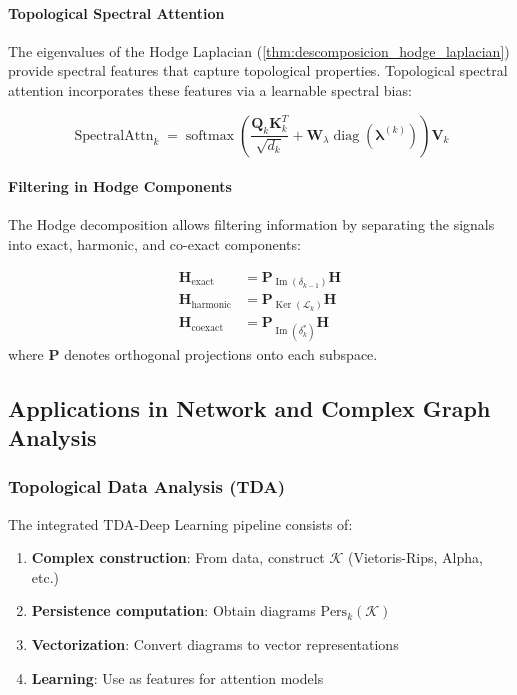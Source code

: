 \paragraph{Topological Spectral Attention}

The eigenvalues of the Hodge Laplacian (\autoref{thm:descomposicion_hodge_laplacian}) provide spectral features that capture topological properties. Topological spectral attention incorporates these features via a learnable spectral bias:

\begin{equation}
\operatorname{SpectralAttn}_k = \operatorname{softmax}\left(\frac{\mathbf{Q}_k \mathbf{K}_k^T}{\sqrt{d_k}} + \mathbf{W}_{\lambda} \operatorname{diag}(\boldsymbol{\lambda}^{(k)})\right) \mathbf{V}_k
\label{eq:spectral_topological_attention}
\end{equation}

\paragraph{Filtering in Hodge Components}

The Hodge decomposition allows filtering information by separating the signals into exact, harmonic, and co-exact components:

\begin{align}
\mathbf{H}_{\text{exact}} &= \mathbf{P}_{\operatorname{Im}(\delta_{k-1})} \mathbf{H} \label{eq:exact_component} \\
\mathbf{H}_{\text{harmonic}} &= \mathbf{P}_{\operatorname{Ker}(\mathcal{L}_k)} \mathbf{H} \\
\mathbf{H}_{\text{coexact}} &= \mathbf{P}_{\operatorname{Im}(\delta_k^*)} \mathbf{H}
\end{align}
where $\mathbf{P}$ denotes orthogonal projections onto each subspace.

\subsection{Applications in Network and Complex Graph Analysis}

\subsubsection{Topological Data Analysis (TDA)}

\begin{definition}\label{def:pipeline_tda_dl}
The integrated TDA-Deep Learning pipeline consists of:
\begin{enumerate}
    \item \textbf{Complex construction}: From data, construct $\mathcal{K}$ (Vietoris-Rips, Alpha, etc.)
    \item \textbf{Persistence computation}: Obtain diagrams $\text{Pers}_k(\mathcal{K})$
    \item \textbf{Vectorization}: Convert diagrams to vector representations
    \item \textbf{Learning}: Use as features for attention models
\end{enumerate}
\end{definition}

